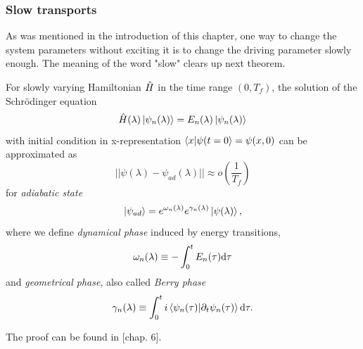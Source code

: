 \subsubsection{Slow transports}
As was mentioned in the introduction of this chapter, one way to change the system parameters without exciting it is to change the driving parameter slowly enough. The meaning of the word "slow" clears up next theorem.
\begin{thm}
    \label{adiabaticTheorem}
    For slowly varying Hamiltonian $\hat{H}$ in the time range $(0,T_f)$, the solution of the Schrödinger equation 
    $$\hat{H}(\lambda)\ket{\psi_n(\lambda)} = E_n(\lambda)\ket{\psi_n(\lambda)}$$
    with initial condition in x-representation $\braket{x|\psi(t=0}=\psi(x,0)$ can be approximated as
    \begin{equation}
      ||\psi(\lambda) - \psi_{ad}(\lambda)||\approx o\left(\frac{1}{T_f}\right)
    \end{equation}
    for \emph{adiabatic state}
    \begin{equation}
        \ket{\psi_{ad}}= e^{\omega_n(\lambda)}e^{\gamma_n(\lambda)}\ket{\psi(\lambda)},
    \end{equation}
    where we define \emph{dynamical phase} induced by energy transitions,
    $$\omega_n(\lambda)\equiv -\int_0^t E_n(\tau)\mathrm{d} \tau$$
    and \emph{geometrical phase}, also called \emph{Berry phase}
        $$\gamma_n(\lambda)\equiv \int_0^t i\braket{\psi_n(\tau)|\partial_t\psi_n(\tau)} \mathrm{d} \tau .$$
\end{thm}
\begin{myproof}
    The proof can be found in \cite{sakurai}[chap. 6].
\end{myproof}














\subsection{}

